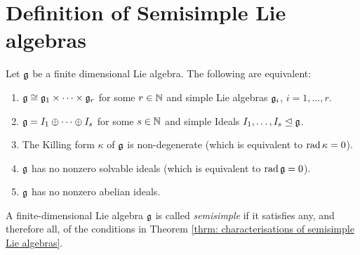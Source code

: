 \section{Definition of Semisimple Lie algebras}


\begin{thrm}\label{thrm: characterisations of semisimple Lie algebras}
 Let $\mathfrak{g}$ be a finite dimensional Lie algebra. The following are equivalent:
 \begin{enumerate}[leftmargin=*]
  \item
   $\mathfrak{g} \cong \mathfrak{g}_1 \times \dotsb \times \mathfrak{g}_r$ for some $r \in \mathbb{N}$ and simple Lie algebras $\mathfrak{g}_i$, $i = 1, \dotsc, r$.
  \item
   $\mathfrak{g} = I_1 \oplus \dotsb \oplus I_s$ for some $s \in \mathbb{N}$ and simple Ideals $I_1, \dotsc, I_s \trianglelefteq \mathfrak{g}$.
  \item
   The Killing form $\kappa$ of $\mathfrak{g}$ is non-degenerate (which is equivalent to $\operatorname{rad} \kappa = 0$).
  \item
   $\mathfrak{g}$ has no nonzero solvable ideals (which is equivalent to $\operatorname{rad} \mathfrak{g} = 0$).
  \item
   $\mathfrak{g}$ has no nonzero abelian ideals.
 \end{enumerate}
\end{thrm}


\begin{defi}
 A finite-dimensional Lie algebra $\mathfrak{g}$ is called \emph{semisimple} if it satisfies any, and therefore all, of the conditions in Theorem \ref{thrm: characterisations of semisimple Lie algebras}.
\end{defi}
